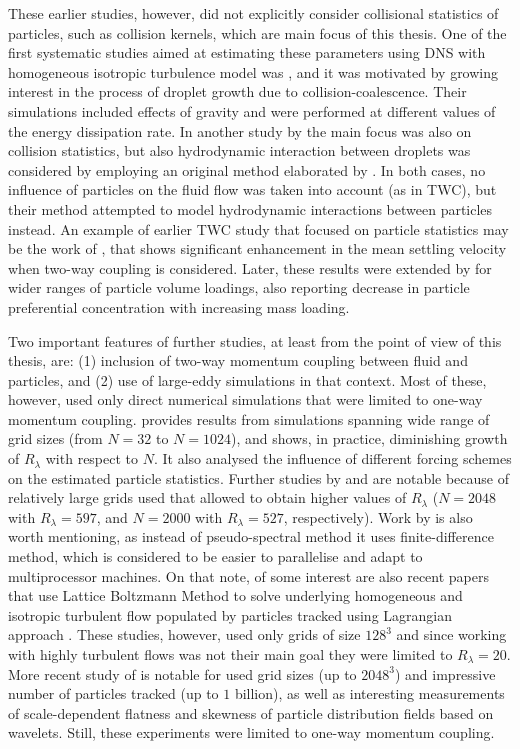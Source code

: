 \documentclass{pracamgren}
\begin{document}
These earlier studies, however, did not explicitly consider collisional statistics of particles, such as collision kernels, which are main focus of this thesis.
One of the first systematic studies aimed at estimating these parameters using DNS with homogeneous isotropic turbulence model was \textcite{Ayala2008}, and it was motivated by growing interest in the process of droplet growth due to collision-coalescence.
Their simulations included effects of gravity and were performed at different values of the energy dissipation rate.
In another study by \textcite{Wang2008} the main focus was also on collision statistics, but also hydrodynamic interaction between droplets was considered by employing an original method elaborated by \textcite{Ayala2007}.
In both cases, no influence of particles on the fluid flow was taken into account (as in TWC), but their method attempted to model hydrodynamic interactions between particles instead.
An example of earlier TWC study that focused on  particle statistics may be the work of \textcite{Bosse2006}, that shows significant enhancement in the mean settling velocity when two-way coupling is considered. 
Later, these results were extended by \textcite{Monchaux2017} for wider ranges of particle volume loadings, also reporting decrease in particle preferential concentration with increasing mass loading.

Two important features of further studies, at least from the point of view of this thesis, are: (1) inclusion of two-way momentum coupling between fluid and particles, and (2) use of large-eddy simulations in that context.
Most of these, however, used only direct numerical simulations that were limited to one-way momentum coupling.
\textcite{Rosa2013} provides results from simulations spanning wide range of grid sizes (from $N=32$ to $N=1024$), and shows, in practice, diminishing growth of $R_{\lambda}$ with respect to $N$.
It also analysed the influence of different forcing schemes on the estimated particle statistics.
Further studies by \textcite{Onishi2013} and \textcite{Ireland2016} are notable because of relatively large grids used that allowed to obtain higher values of $R_{\lambda}$ ($N=2048$ with $R_{\lambda}=597$, and $N=2000$ with $R_{\lambda} = 527$, respectively).
Work by \textcite{Onishi2013} is also worth mentioning, as instead of pseudo-spectral method it uses finite-difference method, which is considered to be easier to parallelise and adapt to multiprocessor machines.
On that note, of some interest are also recent papers that use Lattice Boltzmann Method to solve underlying homogeneous and isotropic turbulent flow populated by particles tracked using Lagrangian approach \parencite{Ernst2019,Lain2020}.
These studies, however, used only grids of size $128^3$ and since working with highly turbulent flows was not their main goal they were limited to $R_{\lambda} = 20$.
More recent study of \textcite{Matsuda2021} is notable for used grid sizes (up to $2048^3$) and impressive number of particles tracked (up to $1$ billion), as well as interesting measurements of scale-dependent flatness and skewness of particle distribution fields based on wavelets.
Still, these experiments were limited to one-way momentum coupling.
\end{document}
